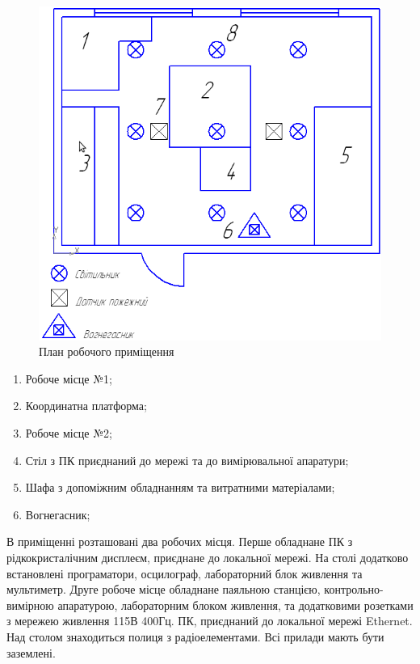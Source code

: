 \documentclass[ukrainian,utf8,simple,floatsubsection, hpadding=5mm,equationsubsection,]{eskdtext}
\begin{document}
\begin{figure}[H]
\centering
\includegraphics[scale=0.6]{lab_plan}
\caption{План робочого приміщення}\label{fig:lab_plan}
\end{figure}

\begin{enumerate}
 \item Робоче місце №1;
 \item Координатна платформа;
 \item Робоче місце №2;
 \item Стіл з ПК приєднаний до мережі та до вимірювальної апаратури;
 \item Шафа з допоміжним обладнанням та витратними матеріалами;
 \item Вогнегасник;
\end{enumerate}

В приміщенні розташовані два робочих місця. Перше обладнане ПК з рідкокристалічним дисплеєм, приєднане до локальної мережі. На столі додатково встановлені програматори, осцилограф, лабораторний блок живлення та мультиметр. Друге робоче місце обладнане паяльною станцією, контрольно-вимірною апаратурою, лабораторним блоком живлення, та додатковими розетками з мережею живлення 115В 400Гц. ПК, приєднаний до локальної мережі Ethernet. Над столом знаходиться полиця з радіоелементами. Всі прилади мають бути заземлені.
\end{document}

